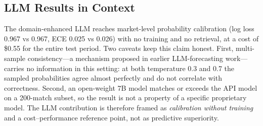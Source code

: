 

\subsection{LLM Results in Context}
The domain-enhanced LLM reaches market-level probability calibration
(log loss 0.967 vs 0.967, ECE 0.025 vs 0.026) with no training and no
retrieval, at a cost of \$0.55 for the entire test period. Two
caveats keep this claim honest. First, multi-sample consistency---a
mechanism proposed in earlier LLM-forecasting work---carries no
information in this setting: at both temperature 0.3 and 0.7 the
sampled probabilities agree almost perfectly and do not correlate
with correctness. Second, an open-weight 7B model matches or exceeds
the API model on a 200-match subset, so the result is not a property
of a specific proprietary model. The LLM contribution is therefore
framed as \emph{calibration without training} and a
cost--performance reference point, not as predictive superiority.

